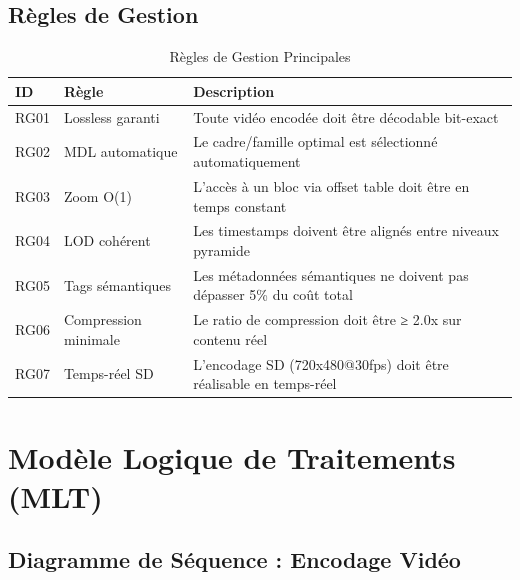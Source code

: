 \documentclass[12pt,a4paper]{article}
\begin{document}
	\subsection{Règles de Gestion}
	\label{subsec:regles_gestion}
	
	\begin{table}[h]
		\centering
		\caption{Règles de Gestion Principales}
		\label{tab:regles_gestion}
		\begin{tabular}{@{}llp{8cm}@{}}
			\toprule
			\textbf{ID} & \textbf{Règle} & \textbf{Description} \\
			\midrule
			RG01 & Lossless garanti & Toute vidéo encodée doit être décodable bit-exact \\
			RG02 & MDL automatique & Le cadre/famille optimal est sélectionné automatiquement \\
			RG03 & Zoom O(1) & L'accès à un bloc via offset table doit être en temps constant \\
			RG04 & LOD cohérent & Les timestamps doivent être alignés entre niveaux pyramide \\
			RG05 & Tags sémantiques & Les métadonnées sémantiques ne doivent pas dépasser 5\% du coût total \\
			RG06 & Compression minimale & Le ratio de compression doit être ≥ 2.0x sur contenu réel \\
			RG07 & Temps-réel SD & L'encodage SD (720x480@30fps) doit être réalisable en temps-réel \\
			\bottomrule
		\end{tabular}
	\end{table}
	
	\section{Modèle Logique de Traitements (MLT)}
	\label{sec:mlt}
	
	\subsection{Diagramme de Séquence : Encodage Vidéo}
	\label{subsec:sequence_encodage}
	
\end{document}
